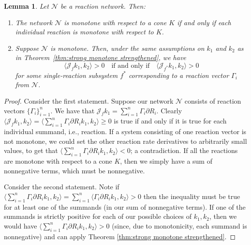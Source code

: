 \documentclass{article}
\newtheorem{lem}{Lemma}
\begin{document}
\begin{lem}
\label{lem:one_reac_makes_strict_monotone}
Let $\mathcal{N}$ be a reaction network. Then:
\begin{enumerate}
    \item The network $\mathcal{N}$ is monotone with respect to a cone $K$ if and only if each individual reaction is monotone with respect to $K$.
    
    \item Suppose $\mathcal{N}$ is monotone. Then, under the same assumptions on $k_1$ and $k_2$ as in Theorem~\ref{thm:strong monotone strengthened}, we have
    \[
    \langle \mathcal{J}_f k_1, k_2 \rangle > 0
    \quad \text{if and only if} \quad
    \langle \mathcal{J}_{f^*} k_1, k_2 \rangle > 0
    \]
    for some single-reaction subsystem $f^*$ corresponding to a reaction vector $\Gamma_i$ from $\mathcal{N}$.
\end{enumerate}
\end{lem}




\begin{proof}
    Consider the first statement. Suppose our network $\mathcal{N}$ consists of reaction vectors $\{\Gamma_i\}_{i=1}^n$. We have that $\mathcal{J}_f k_1 = \sum_{i=1}^n \Gamma_i \partial R_i$. Clearly $\langle \mathcal{J}_f k_1, k_2 \rangle = \langle  \sum_{i=1}^n \Gamma_i \partial R_i k_1, k_2 \rangle \geq 0$ is true if and only if it is true for each individual summand, i.e., reaction. If a system consisting of one reaction vector is not monotone, we could set the other reaction rate derivatives to arbitrarily small values, to get that $\langle  \sum_{i=1}^n \Gamma_i \partial R_i k_1, k_2 \rangle < 0 $; a contradiction. If all the reactions are monotone with respect to a cone $K$, then we simply have a sum of nonnegative terms, which must be nonnegative.


    Consider the second statement. Note if $\langle  \sum_{i=1}^n \Gamma_i \partial R_i k_1, k_2 \rangle = \sum_{i=1}^n \langle   \Gamma_i \partial R_i k_1, k_2 \rangle > 0 $ then the inequality must be true for at least one of the summands (in our sum of nonnegative terms). If one of the summands is strictly positive for each of our possible choices of $k_1,k_2$, then we would have $\langle  \sum_{i=1}^n \Gamma_i \partial R_i k_1, k_2 \rangle > 0 $ (since, due to monotonicity, each summand is nonnegative) and can apply Theorem \ref{thm:strong monotone strengthened}.
\end{proof}
\end{document}
